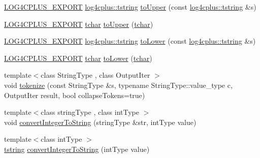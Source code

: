 \begin{DoxyCompactItemize}
\item 
\hyperlink{config_8hxx_ab13cb1a5317c245ee2ef4f2bfe0cfb2d}{L\-O\-G4\-C\-P\-L\-U\-S\-\_\-\-E\-X\-P\-O\-R\-T} \hyperlink{namespacelog4cplus_a3c9287f6ebcddc50355e29d71152117b}{log4cplus\-::tstring} \hyperlink{namespacelog4cplus_1_1helpers_a2df07e0033234268e8d698a2ef11afbc}{to\-Upper} (const \hyperlink{namespacelog4cplus_a3c9287f6ebcddc50355e29d71152117b}{log4cplus\-::tstring} \&s)
\item 
\hyperlink{config_8hxx_ab13cb1a5317c245ee2ef4f2bfe0cfb2d}{L\-O\-G4\-C\-P\-L\-U\-S\-\_\-\-E\-X\-P\-O\-R\-T} \hyperlink{namespacelog4cplus_a7b80b5711ae9e7a1ddd97dbaefbe3583}{tchar} \hyperlink{namespacelog4cplus_1_1helpers_a1f1dc9f84d7ce9150439a28e0b39bad6}{to\-Upper} (\hyperlink{namespacelog4cplus_a7b80b5711ae9e7a1ddd97dbaefbe3583}{tchar})
\item 
\hyperlink{config_8hxx_ab13cb1a5317c245ee2ef4f2bfe0cfb2d}{L\-O\-G4\-C\-P\-L\-U\-S\-\_\-\-E\-X\-P\-O\-R\-T} \hyperlink{namespacelog4cplus_a3c9287f6ebcddc50355e29d71152117b}{log4cplus\-::tstring} \hyperlink{namespacelog4cplus_1_1helpers_ab5f1848c93434c55e2fb05066a916023}{to\-Lower} (const \hyperlink{namespacelog4cplus_a3c9287f6ebcddc50355e29d71152117b}{log4cplus\-::tstring} \&s)
\item 
\hyperlink{config_8hxx_ab13cb1a5317c245ee2ef4f2bfe0cfb2d}{L\-O\-G4\-C\-P\-L\-U\-S\-\_\-\-E\-X\-P\-O\-R\-T} \hyperlink{namespacelog4cplus_a7b80b5711ae9e7a1ddd97dbaefbe3583}{tchar} \hyperlink{namespacelog4cplus_1_1helpers_a6e10b2cb52741ff6253c82fe6e590358}{to\-Lower} (\hyperlink{namespacelog4cplus_a7b80b5711ae9e7a1ddd97dbaefbe3583}{tchar})
\item 
{\footnotesize template$<$class String\-Type , class Output\-Iter $>$ }\\void \hyperlink{namespacelog4cplus_1_1helpers_a85d88f7190288c19c3020204f0630254}{tokenize} (const String\-Type \&s, typename String\-Type\-::value\-\_\-type c, Output\-Iter result, bool collapse\-Tokens=true)
\item 
{\footnotesize template$<$class string\-Type , class int\-Type $>$ }\\void \hyperlink{namespacelog4cplus_1_1helpers_a5a2959bad8f5c127a8390e9c9c6212a5}{convert\-Integer\-To\-String} (string\-Type \&str, int\-Type value)
\item 
{\footnotesize template$<$class int\-Type $>$ }\\\hyperlink{namespacelog4cplus_a3c9287f6ebcddc50355e29d71152117b}{tstring} \hyperlink{namespacelog4cplus_1_1helpers_ac468f8e03ad467003d2c7821404e704d}{convert\-Integer\-To\-String} (int\-Type value)

\end{DoxyCompactItemize}
